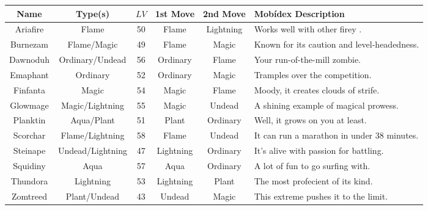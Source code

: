 \begin{center}
\begin{tabular}{|c|c|c|c|c|p{2in}|}\hline
  Name & Type(s) & \(LV\) & 1st Move & 2nd Move & Mob\'idex Description \\\hline\hline
  Ariafire & Flame & 50 & Flame & Lightning &
    Works well with other firey \mappMobimon{}. \\\hline
  Burnezam & Flame/Magic & 49 & Flame & Magic &
    Known for its caution and level-headedness. \\\hline
  Dawnoduh & Ordinary/Undead & 56 & Ordinary & Flame &
    Your run-of-the-mill zombie. \\\hline
  Emaphant & Ordinary & 52 & Ordinary & Magic &
    Tramples over the competition. \\\hline
  Finfanta & Magic & 54 & Magic & Flame &
    Moody, it creates clouds of strife. \\\hline
  Glowmage & Magic/Lightning & 55 & Magic & Undead &
    A shining example of magical prowess. \\\hline
  Planktin & Aqua/Plant & 51 & Plant & Ordinary &
    Well, it grows on you at least. \\\hline
  Scorchar & Flame/Lightning & 58 & Flame & Undead &
    It can run a marathon in under 38 minutes. \\\hline
  Steinape & Undead/Lightning & 47 & Lightning & Ordinary &
    It's alive with passion for battling. \\\hline
  Squidiny & Aqua & 57 & Aqua & Ordinary &
    A lot of fun to go surfing with. \\\hline
  Thundora & Lightning & 53 & Lightning & Plant &
    The most profecient of its kind. \\\hline
  Zomtreed & Plant/Undead & 43 & Undead & Magic &
    This extreme \mappMobimon{} pushes it to the limit. \\\hline
\end{tabular}
\end{center}


